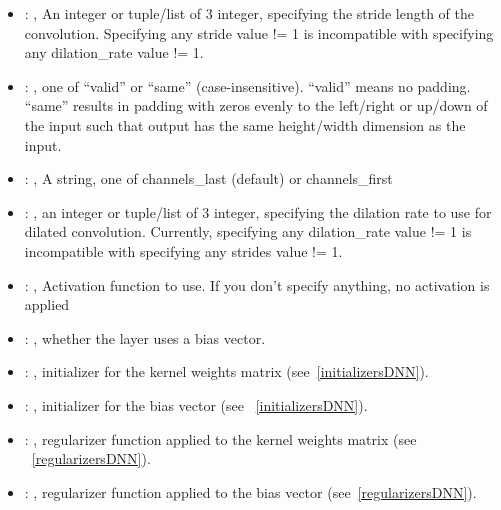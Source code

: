 \begin{itemize}
\begin{itemize}
        \item {}: , 
          An integer or tuple/list of 3 integer, specifying the stride length of the convolution.
          Specifying any stride value != 1 is incompatible with specifying any dilation\_rate value
          != 1.

        \item {}: , 
          one of ``valid'' or ``same'' (case-insensitive). ``valid'' means no padding. ``same''
          results in padding         with zeros evenly to the left/right or up/down of the input
          such that output has the same height/width         dimension as the input.

        \item {}: , 
          A string, one of channels\_last (default) or channels\_first

        \item {}: , 
          an integer or tuple/list of 3 integer, specifying the dilation rate to use for dilated
          convolution. Currently, specifying any dilation\_rate value != 1 is incompatible with
          specifying any         strides value != 1.

        \item {}: , 
          Activation function to use. If you don't specify anything, no activation is applied

        \item {}: , 
          whether the layer uses a bias vector.

        \item {}: , 
          initializer for the kernel weights matrix (see~\ref{initializersDNN}).

        \item {}: , 
          initializer for the bias vector (see ~\ref{initializersDNN}).

        \item {}: , 
          regularizer function applied to the kernel weights matrix (see ~\ref{regularizersDNN}).

        \item {}: , 
          regularizer function applied to the bias vector (see~\ref{regularizersDNN}).


\end{itemize}
\end{itemize}
